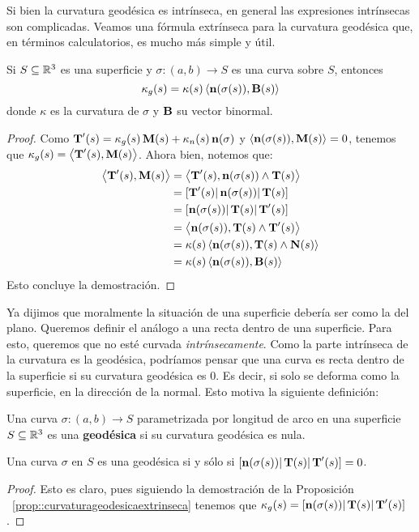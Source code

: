 Si bien la curvatura geodésica es intrínseca, en general las expresiones intrínsecas son complicadas. Veamos una fórmula extrínseca para la curvatura geodésica que, en términos calculatorios, es mucho más simple y útil.

\begin{prop}\label{prop::curvaturageodesicaextrinseca}
Si $S\subseteq\mathbb{R}^3$ es una superficie y $\sigma:(a,b)\to S$ es una curva sobre $S$, entonces $$\kappa_g(s)=\kappa(s)\left\langle \operatorname{\mathbf{n}}(\sigma(s)),\operatorname{\mathbf{B}}(s) \right\rangle$$ donde $\kappa$ es la curvatura de $\sigma$ y $\operatorname{\mathbf{B}}$ su vector binormal.
\begin{proof}
Como $\operatorname{\mathbf{T}}'(s)=\kappa_g(s)\operatorname{\mathbf{M}}(s)+\kappa_n(s)\operatorname{\mathbf{n}}(\sigma)$ y $\left\langle \operatorname{\mathbf{n}}(\sigma(s)),\operatorname{\mathbf{M}}(s) \right\rangle=0$, tenemos que $\kappa_g(s)=\left\langle \operatorname{\mathbf{T}}'(s),\operatorname{\mathbf{M}}(s) \right\rangle$. Ahora bien, notemos que: \begin{align*}\left\langle \operatorname{\mathbf{T}}'(s),\operatorname{\mathbf{M}}(s) \right\rangle&=\left\langle \operatorname{\mathbf{T}}'(s),\operatorname{\mathbf{n}}(\sigma(s))\wedge\operatorname{\mathbf{T}}(s) \right\rangle\\&=[\operatorname{\mathbf{T}}'(s)|\operatorname{\mathbf{n}}(\sigma(s))|\operatorname{\mathbf{T}}(s)]\\&=[\operatorname{\mathbf{n}}(\sigma(s))|\operatorname{\mathbf{T}}(s)|\operatorname{\mathbf{T}}'(s)] \\&= \left\langle \operatorname{\mathbf{n}}(\sigma(s)),\operatorname{\mathbf{T}}(s)\wedge\operatorname{\mathbf{T}}'(s) \right\rangle \\&= \kappa(s)\left\langle \operatorname{\mathbf{n}}(\sigma(s)),\operatorname{\mathbf{T}}(s)\wedge\operatorname{\mathbf{N}}(s) \right\rangle\\&=\kappa(s)\left\langle \operatorname{\mathbf{n}}(\sigma(s)),\operatorname{\mathbf{B}}(s) \right\rangle\end{align*} Esto concluye la demostración.
\end{proof}
\end{prop}

Ya dijimos que moralmente la situación de una superficie debería ser como la del plano. Queremos definir el análogo a una recta dentro de una superficie. Para esto, queremos que no esté curvada \textit{intrínsecamente}. Como la parte intrínseca de la curvatura es la geodésica, podríamos pensar que una curva es recta dentro de la superficie si su curvatura geodésica es $0$. Es decir, si solo se deforma como la superficie, en la dirección de la normal. Esto motiva la siguiente definición:

\begin{defn}
Una curva $\sigma:(a,b)\to S$ parametrizada por longitud de arco en una superficie $S\subseteq\mathbb{R}^3$ es una \textbf{geodésica} si su curvatura geodésica es nula.
\end{defn}

\begin{prop}
Una curva $\sigma$ en $S$ es una geodésica si y sólo si $[\operatorname{\mathbf{n}}(\sigma(s))|\operatorname{\mathbf{T}}(s)|\operatorname{\mathbf{T}}'(s)]=0$.
\begin{proof}
Esto es claro, pues siguiendo la demostración de la Proposición ~\ref{prop::curvaturageodesicaextrinseca} tenemos que $\kappa_g(s)=[\operatorname{\mathbf{n}}(\sigma(s))|\operatorname{\mathbf{T}}(s)|\operatorname{\mathbf{T}}'(s)]$.
\end{proof}
\end{prop}

